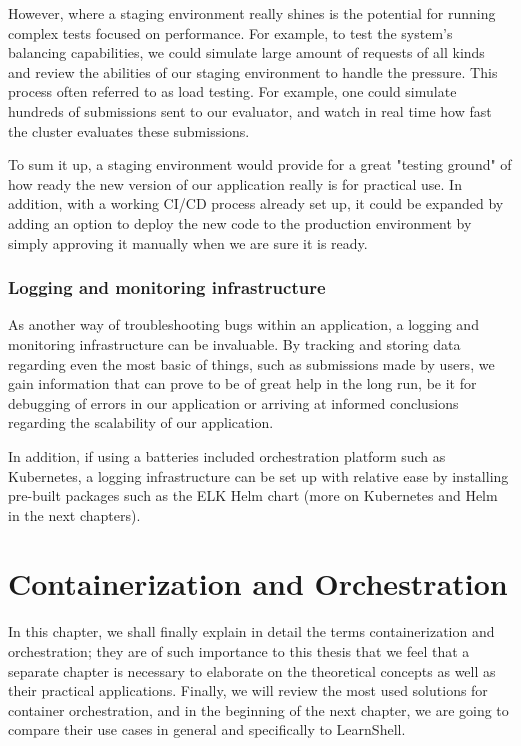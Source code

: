 \documentclass[thesis=B,english]{FITthesis}[2019/12/23]
\begin{document}
However, where a staging environment really shines is the potential for running complex tests focused on performance. For example, to test the system's balancing capabilities, we could simulate large amount of requests of all kinds and review the abilities of our staging environment to handle the pressure. This process often referred to as load testing. For example, one could simulate hundreds of submissions sent to our evaluator, and watch in real time how fast the cluster evaluates these submissions.

To sum it up, a staging environment would provide for a great "testing ground" of how ready the new version of our application really is for practical use. In addition, with a working CI/CD process already set up, it could be expanded by adding an option to deploy the new code to the production environment by simply approving it manually when we are sure it is ready.

\subsection{Logging and monitoring infrastructure}

As another way of troubleshooting bugs within an application, a logging and monitoring infrastructure can be invaluable. By tracking and storing data regarding even the most basic of things, such as submissions made by users, we gain information that can prove to be of great help in the long run, be it for debugging of errors in our application or arriving at informed conclusions regarding the scalability of our application.

In addition, if using a batteries included orchestration platform such as Kubernetes, a logging infrastructure can be set up with relative ease by installing pre-built packages such as the ELK Helm chart (more on Kubernetes and Helm in the next chapters).


\chapter{Containerization and Orchestration}

In this chapter, we shall finally explain in detail the terms containerization and orchestration; they are of such importance to this thesis that we feel that a separate chapter is necessary to elaborate on the theoretical concepts as well as their practical applications. Finally, we will review the most used solutions for container orchestration, and in the beginning of the next chapter, we are going to compare their use cases in general and specifically to LearnShell.
\end{document}
